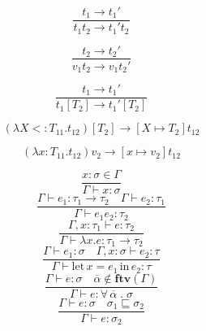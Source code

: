 \documentclass[main.tex]{subfiles}
\begin{document}
\begin{center}
\noindent%
\begin{equation}
  \tag*{(E-App1)}
  \frac{t_1 \rightarrow t_1'}{t_1 t_2 \rightarrow t_1' t_2}
\end{equation}

\begin{equation}
  \tag*{(E-App2)}
  \frac{t_2 \rightarrow t_2'}{v_1 t_2 \rightarrow v_1 t_2'}
\end{equation}

\begin{equation}
  \tag*{(E-TApp)}
  \frac{t_1 \rightarrow t_1'}{t_1 [T_2] \rightarrow t_1' [T_2]}
\end{equation}

\begin{equation}
  \tag*{(E-TAppTAbs)}
  (\lambda X <: T_{11} . t_{12}) [T_2] \rightarrow [X \mapsto T_2]t_{12}
\end{equation}

\begin{equation}
  \tag*{(E-AppAbs)}
  (\lambda x : T_{11} . t_{12}) v_2 \rightarrow [x \mapsto v_2]t_{12}
\end{equation}

\end{center}


\begin{center}
\noindent
  \begin{equation}
    \tag*{(T-Var)}
    \frac{x : \sigma \in \Gamma}{\Gamma \vdash x : \sigma}
  \end{equation}
  \begin{equation}
    \tag*{(T-App)}
    \frac{\Gamma \vdash e_1 : \tau_1 \rightarrow \tau_2 \quad \Gamma \vdash e_2 : \tau_1}{\Gamma \vdash e_1 e_2 : \tau_2}
  \end{equation}
  \begin{equation}
    \tag*{(T-Lam)}
    \frac{\Gamma, x : \tau_1 \vdash e : \tau_2}{\Gamma \vdash \lambda x . e : \tau_1 \rightarrow \tau_2}
  \end{equation}
  \begin{equation}
    \tag*{(T-Let)}
    \frac{\Gamma \vdash e_1 : \sigma \quad \Gamma, x : \sigma \vdash e_2 : \tau}{\Gamma \vdash \text{let} \, x = e_1 \, \text{in} \, e_2 : \tau}
  \end{equation}
  \begin{equation}
    \tag*{(T-Gen)}
    \frac{\Gamma \vdash e : \sigma \quad \overline{\alpha} \notin \textbf{ftv}(\Gamma)}{\Gamma \vdash e : \forall \, \overline{\alpha} \; . \; \sigma}
  \end{equation}
  \begin{equation}
    \tag*{(T-Inst)}
    \frac{\Gamma \vdash e : \sigma \quad \sigma_1 \sqsubseteq \sigma_2}{\Gamma \vdash e : \sigma_2}
  \end{equation}
\end{center}
\end{document}
